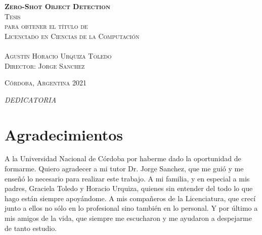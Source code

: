 \documentclass[12pt,twosided]{book}
\begin{document}
\begin{titlepage}
\begin{center}
\vspace{1em}

\textsc{\huge \textbf{Zero-Shot Object Detection}}\\[2em]

\textsc{\large Tesis}\\[1em]

\textsc{ para obtener el título de}\\[1em]

\textsc{Licenciado en Ciencias de la Computación}\\[1em]

\textsc{}\\[1em]

\textsc{\Large Agustin Horacio Urquiza Toledo}\\[1em]

\textsc{\large Director: Jorge Sanchez}

\end{center}

\vspace*{\fill}
\textsc{Córdoba, Argentina \hspace*{\fill} 2021}

\end{titlepage}

\pagestyle{empty}
\frontmatter

\begin{flushright}
\textit{DEDICATORIA}
\end{flushright}

\chapter*{Agradecimientos}
A la Universidad Nacional de Córdoba por haberme dado la
oportunidad de formarme. Quiero agradecer a mi tutor Dr. Jorge Sanchez, que me guió y me enseñó lo necesario para realizar este trabajo. A mi familia, y en especial a mis padres, Graciela Toledo y Horacio Urquiza, quienes sin entender del todo lo que hago están siempre apoyándome. A mis compañeros de la Licenciatura, que crecí junto a ellos no sólo en lo profesional sino también en lo personal. Y por último a mis amigos de la vida, que siempre me escucharon y me ayudaron a despejarme de tanto estudio.
\end{document}
